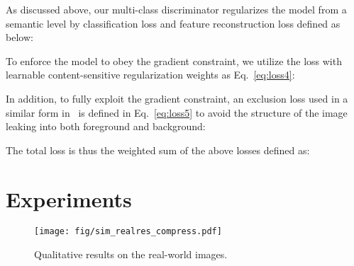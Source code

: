 \documentclass[10pt,twocolumn,letterpaper]{article}
\newcommand\cspace{15}
\begin{document}
\vspace {0pt}
As discussed above, our multi-class discriminator regularizes the model from a semantic level by classification loss  and feature reconstruction loss  defined as below:



\vspace {0pt}
 To enforce the model to obey the gradient constraint, we utilize the loss with learnable content-sensitive regularization weights as Eq.~\ref{eq:loss4}:



In addition, to fully exploit the gradient constraint, an exclusion loss used in a similar form in~\cite{exclusiveloss} is defined in Eq.~\ref{eq:loss5} to avoid the structure of the image leaking into both foreground and background: 


\vspace {4pt}
 The total loss is thus the weighted sum of the above losses defined as: 


\section{Experiments}

\begin{table}[t]
    \centering
    \vspace{5pt}
    \caption{Comparisons on Semantic Image Matting Dataset.}
    \label{tab:comparison}
    \vspace{-\cspace pt}
\end{table}


\begin{figure*}[t]
\centering 
\texttt{[image: fig/sim\_realres\_compress.pdf]} 
\caption{Qualitative results on the real-world images.}
\label{fig:sim_real_res}
\vspace{-\cspace pt}
\end{figure*}
\end{document}

